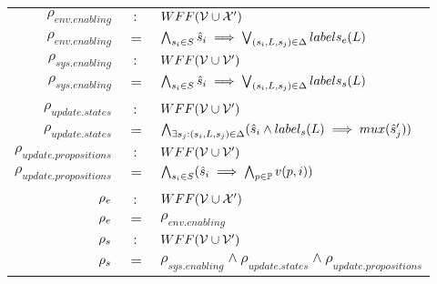 \vspace{1em}
\begin{tabular}{ r c l }
	$\rho_{env.enabling}$&$:$&$WFF({\mathcal{V}} \cup {\ensuremath{\mathcal{X}}}')$\\
	$\rho_{env.enabling}$ &$=$& $\bigwedge_{s_i \in S} \hat{s}_{i} \implies \bigvee_{(s_i,L,s_j) \in \Delta}labels_e(L)$\\
	$\rho_{sys.enabling}$&$:$&$WFF({\mathcal{V}} \cup {\ensuremath{\mathcal{V}}}')$\\
	$\rho_{sys.enabling}$ &$=$& $\bigwedge_{s_i \in S} \hat{s}_{i} \implies \bigvee_{(s_i,L,s_j) \in \Delta}labels_s(L)$\\
	&&\\
	$\rho_{update.states}$&$:$&$WFF({\mathcal{V}} \cup {\ensuremath{\mathcal{V}}}')$\\
$\rho_{update.states}$&$=$&$\bigwedge_{\exists s_j:(s_i,L,s_j) \in \Delta} (\hat{s}_{i} \wedge label_s(L) \implies mux(\hat{s}_{j}') ) $\\	
	$\rho_{update.propositions}$&$:$&$WFF({\mathcal{V}} \cup {\ensuremath{\mathcal{V}}}')$\\
	$\rho_{update.propositions}$&$=$&$\bigwedge_{s_i \in S} (\hat{s}_{i} \implies \bigwedge_{p \in \mathbb{P}}v(p,i) )$\\
	&&\\
	${\rho_e}$&$:$&$WFF({\mathcal{V}} \cup {\ensuremath{\mathcal{X}}}')$\\
	${\rho_e}$&$=$&$\rho_{env.enabling}$\\		
	${\rho_s}$&$:$&$WFF({\mathcal{V}} \cup {\ensuremath{\mathcal{V}}}')$\\	
	${\rho_s}$&$=$&$\rho_{sys.enabling} \wedge  \rho_{update.states} \wedge  \rho_{update.propositions}$\\	
\end{tabular}
\vspace{1em}

